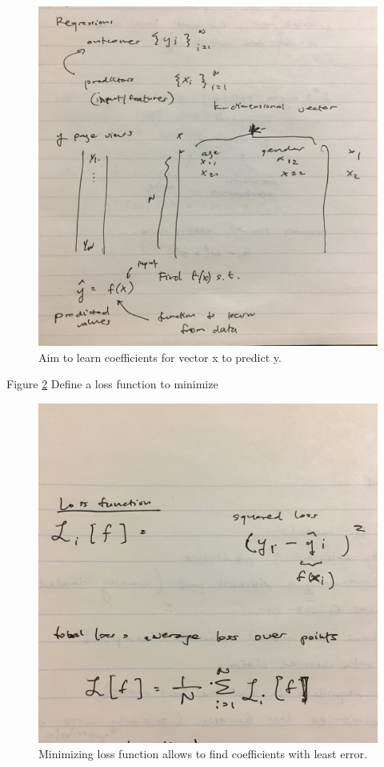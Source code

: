 \begin{figure}[ht]
  \begin{center}
    \includegraphics[width=.9\textwidth,angle=270]{figures/IMG_6640.JPG}
    \caption{
      Aim to learn coefficients for vector x to predict y.}
    \label{fig:example_figure}
  \end{center}
\end{figure}

\pagebreak

Figure \ref{fig:example_figure2} Define a loss function to minimize

\begin{figure}[ht]
  \begin{center}
    \includegraphics[width=.9\textwidth,angle=270]{figures/IMG_6641.JPG}
    \caption{
      Minimizing loss function allows to find coefficients with least error.}
    \label{fig:example_figure2}
  \end{center}
\end{figure}

